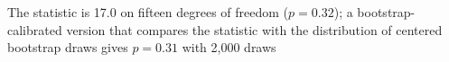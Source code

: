 The statistic is 17.0 on fifteen degrees of freedom ($p = 0.32$); a bootstrap-calibrated version that compares the statistic with the distribution of centered bootstrap draws gives $p = 0.31$ with 2,000 draws%
